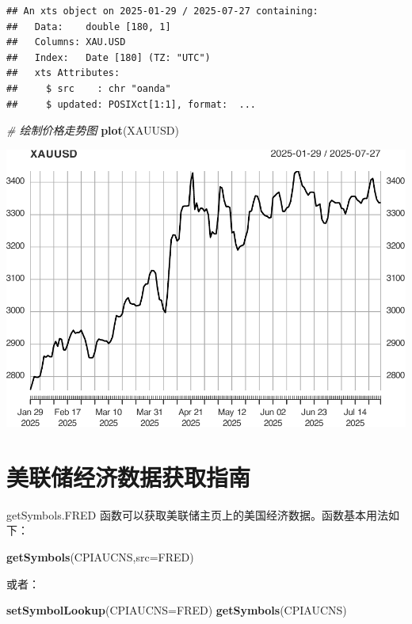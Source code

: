 \documentclass[]{ctexbook}
\newenvironment{Shaded}{\begin{snugshade}}{\end{snugshade}}
\newcommand{\AttributeTok}[1]{\textcolor[rgb]{0.13,0.29,0.53}{#1}}
\newcommand{\CommentTok}[1]{\textcolor[rgb]{0.56,0.35,0.01}{\textit{#1}}}
\newcommand{\FunctionTok}[1]{\textcolor[rgb]{0.13,0.29,0.53}{\textbf{#1}}}
\newcommand{\NormalTok}[1]{#1}
\newcommand{\StringTok}[1]{\textcolor[rgb]{0.31,0.60,0.02}{#1}}
\begin{document}
\begin{verbatim}
## An xts object on 2025-01-29 / 2025-07-27 containing: 
##   Data:    double [180, 1]
##   Columns: XAU.USD
##   Index:   Date [180] (TZ: "UTC")
##   xts Attributes:
##     $ src    : chr "oanda"
##     $ updated: POSIXct[1:1], format:  ...
\end{verbatim}

\begin{Shaded}
\begin{Highlighting}[]
\CommentTok{\# 绘制价格走势图}
\FunctionTok{plot}\NormalTok{(XAUUSD)}
\end{Highlighting}
\end{Shaded}

\includegraphics[width=0.9\linewidth]{QuantmodHandbook_files/figure-latex/vis_xau-1}

\section{美联储经济数据获取指南}\label{ux7f8eux8054ux50a8ux7ecfux6d4eux6570ux636eux83b7ux53d6ux6307ux5357}

getSymbols.FRED 函数可以获取美联储主页上的美国经济数据。函数基本用法如下：

\begin{Shaded}
\begin{Highlighting}[]
\FunctionTok{getSymbols}\NormalTok{(}\StringTok{\textquotesingle{}CPIAUCNS\textquotesingle{}}\NormalTok{,}\AttributeTok{src=}\StringTok{\textquotesingle{}FRED\textquotesingle{}}\NormalTok{)}
\end{Highlighting}
\end{Shaded}

或者：

\begin{Shaded}
\begin{Highlighting}[]
\FunctionTok{setSymbolLookup}\NormalTok{(}\AttributeTok{CPIAUCNS=}\StringTok{\textquotesingle{}FRED\textquotesingle{}}\NormalTok{)}
\FunctionTok{getSymbols}\NormalTok{(}\StringTok{\textquotesingle{}CPIAUCNS\textquotesingle{}}\NormalTok{)}
\end{Highlighting}
\end{Shaded}
\end{document}
